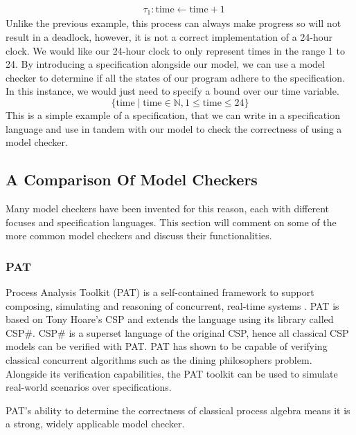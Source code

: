\[
\begin{aligned}
& \tau_1: \text{time} \leftarrow \text{time} + 1
\end{aligned}
\]
Unlike the previous example, this process can always make progress so will not result in a deadlock, however, it is not a correct implementation of a 24-hour clock. We would like our 24-hour clock to only represent times in the range 1 to 24. By introducing a specification alongside our model, we can use a model checker to determine if all the states of our program adhere to the specification. In this instance, we would just need to specify a bound over our time variable.
\[
\{ \text{time} \mid \text{time} \in \mathbb{N}, 1 \leq \text{time} \leq 24 \}
\]
This is a simple example of a specification, that we can write in a specification language and use in tandem with our model to check the correctness of using a model checker.
\subsection{A Comparison Of Model Checkers}
Many model checkers have been invented for this reason, each with different focuses and specification languages. This section will comment on some of the more common model checkers and discuss their functionalities. \\
\subsubsection*{\textbf{PAT}}
Process Analysis Toolkit (PAT) is a self-contained framework to support composing, simulating and reasoning of concurrent, real-time systems \cite{pat}. PAT is based on Tony Hoare's CSP and extends the language using its library called CSP\#. CSP\# is a superset language of the original CSP, hence all classical CSP models can be verified with PAT. PAT has shown to be capable of verifying classical concurrent algorithms such as the dining philosophers problem. Alongside its verification capabilities, the PAT toolkit can be used to simulate real-world scenarios over specifications. 
\par
PAT's ability to determine the correctness of classical process algebra means it is a strong, widely applicable model checker.

